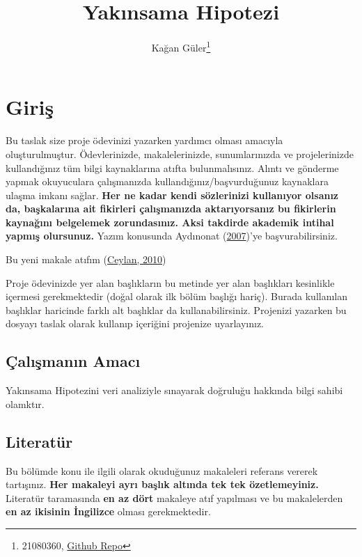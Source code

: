 \documentclass[
  12pt,
]{article}
\title{Yakınsama Hipotezi}
\author{Kağan Güler\footnote{21080360, \href{https://github.com/kaganglr/AraSinav}{Github Repo}}}
\date{}
\begin{document}
\maketitle

\hypertarget{giriux15f}{%
\section{Giriş}\label{giriux15f}}

Bu taslak size proje ödevinizi yazarken yardımcı olması amacıyla oluşturulmuştur. Ödevlerinizde, makalelerinizde, sunumlarınızda ve projelerinizde kullandığınız tüm bilgi kaynaklarına atıfta bulunmalısınız. Alıntı ve gönderme yapmak okuyuculara çalışmanızda kullandığınız/başvurduğunuz kaynaklara ulaşma imkanı sağlar. \textbf{Her ne kadar kendi sözlerinizi kullanıyor olsanız da, başkalarına ait fikirleri çalışmanızda aktarıyorsanız bu fikirlerin kaynağını belgelemek zorundasınız. Aksi takdirde akademik intihal yapmış olursunuz.} Yazım konusunda Aydınonat (\protect\hyperlink{ref-aydinonat:2007}{2007})'ye başvurabilirsiniz.

Bu yeni makale atıfım (\protect\hyperlink{ref-ceylan2010yakinsama}{Ceylan, 2010})

Proje ödevinizde yer alan başlıkların bu metinde yer alan başlıkları kesinlikle içermesi gerekmektedir (doğal olarak ilk bölüm başlığı hariç). Burada kullanılan başlıklar haricinde farklı alt başlıklar da kullanabilirsiniz. Projenizi yazarken bu dosyayı taslak olarak kullanıp içeriğini projenize uyarlayınız.

\hypertarget{uxe7alux131ux15fmanux131n-amacux131}{%
\subsection{Çalışmanın Amacı}\label{uxe7alux131ux15fmanux131n-amacux131}}

Yakınsama Hipotezini veri analiziyle sınayarak doğruluğu hakkında bilgi sahibi olamktır.

\hypertarget{literatuxfcr}{%
\subsection{Literatür}\label{literatuxfcr}}

Bu bölümde konu ile ilgili olarak okuduğunuz makaleleri referans vererek tartışınız. \textbf{Her makaleyi ayrı başlık altında tek tek özetlemeyiniz.} Literatür taramasında \textbf{en az dört} makaleye atıf yapılması ve bu makalelerden \textbf{en az ikisinin İngilizce} olması gerekmektedir.
\end{document}
